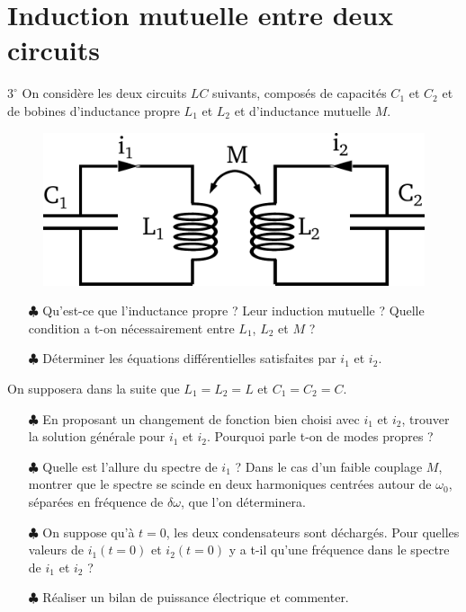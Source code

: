 \documentclass{report}
\begin{document}
\section*{Induction mutuelle entre deux circuits}
$3^\circ$
On considère les deux circuits $LC$ suivants, composés de capacités $C_1$ et $C_2$ et de bobines d'inductance propre $L_1$ et $L_2$ et d'inductance mutuelle $M$. 

\begin{figure}[h!]
\centering
		\includegraphics[scale=0.45]{induction_mutuelle.pdf}
\end{figure}

\begin{itemize}
	
	\item[$\clubsuit$] Qu'est-ce que l'inductance propre ? Leur induction mutuelle ? Quelle condition a t-on nécessairement entre $L_1$, $L_2$ et $M$ ?
	
	\item[$\clubsuit$] Déterminer les équations différentielles satisfaites par $i_1$ et $i_2$.
	
\end{itemize}

On supposera dans la suite que $L_1=L_2=L$ et $C_1=C_2=C$.

\begin{itemize}	
	
	\item[$\clubsuit$] En proposant un changement de fonction bien choisi avec $i_1$ et $i_2$, trouver la solution générale pour $i_1$ et $i_2$. Pourquoi parle t-on de modes propres ?
	
	\item[$\clubsuit$] Quelle est l'allure du spectre de $i_1$ ? Dans le cas d'un faible couplage $M$, montrer que le spectre se scinde en deux harmoniques centrées autour de $\omega_0$, séparées en fréquence de $\delta\omega$, que l'on déterminera.  
	
	\item[$\clubsuit$] On suppose qu'à $t=0$, les deux condensateurs sont déchargés. Pour quelles valeurs de $i_1(t=0)$ et $i_2(t=0)$ y a t-il qu'une fréquence dans le spectre de $i_1$ et $i_2$ ?
	
	\item[$\clubsuit$] Réaliser un bilan de puissance électrique et commenter. 
	
\end{itemize}
\end{document}

